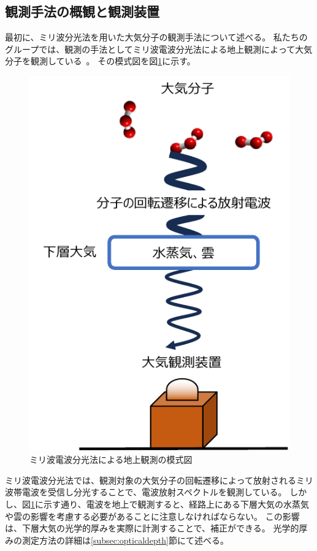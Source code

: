 \subsection{観測手法の概観と観測装置}
最初に、ミリ波分光法を用いた大気分子の観測手法について述べる。
私たちのグループでは、観測の手法としてミリ波電波分光法による地上観測によって大気分子を観測している~\cite{mizuno2002millimeter}。
その模式図を図\ref{fig:spectrometer_schema}に示す。
\begin{figure}[htbp]
    \centering
    \includegraphics{master_thesis_contents/master_thesis_fig/spectrometer_schema.pdf}
    \caption{ミリ波電波分光法による地上観測の模式図}
    \label{fig:spectrometer_schema}
\end{figure}
ミリ波電波分光法では、観測対象の大気分子の回転遷移によって放射されるミリ波帯電波を受信し分光することで、電波放射スペクトルを観測している。
しかし、図\ref{fig:spectrometer_schema}に示す通り、電波を地上で観測すると、経路上にある下層大気の水蒸気や雲の影響を考慮する必要があることに注意しなければならない。
この影響は、下層大気の光学的厚みを実際に計測することで、補正ができる。
光学的厚みの測定方法の詳細は\ref{subsec:opticaldepth}節にて述べる。\par

